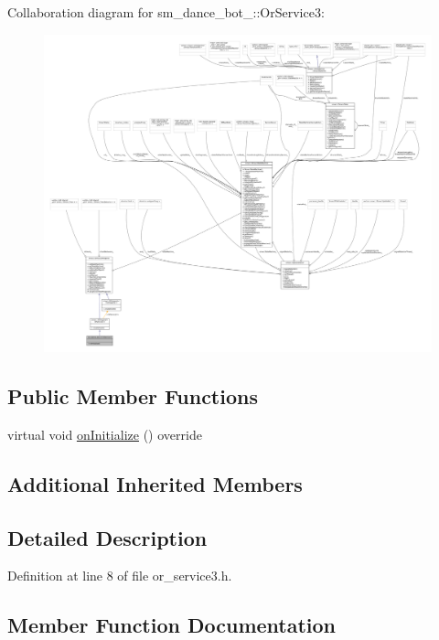 Collaboration diagram for sm\+\_\+dance\+\_\+bot\+\_\+:\+:Or\+Service3\+:
\nopagebreak
\begin{figure}[H]
\begin{center}
\leavevmode
\includegraphics[width=350pt]{classsm__dance__bot__2_1_1OrService3__coll__graph}
\end{center}
\end{figure}
\subsection*{Public Member Functions}
\begin{DoxyCompactItemize}
\item 
virtual void \hyperlink{classsm__dance__bot__2_1_1OrService3_a120b2778c68d7b237f54a8260430773f}{on\+Initialize} () override
\end{DoxyCompactItemize}
\subsection*{Additional Inherited Members}


\subsection{Detailed Description}


Definition at line 8 of file or\+\_\+service3.\+h.



\subsection{Member Function Documentation}
\mbox{\label{classsm__dance__bot__2_1_1OrService3_a120b2778c68d7b237f54a8260430773f}} 
